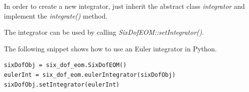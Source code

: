 \documentclass[]{AVSSimReportMemo}
\begin{document}
In order to create a new integrator, just inherit the abstract class \textit{integrator} and implement the \textit{integrate()} method.

The integrator can be used by calling \textit{SixDofEOM::setIntegrator()}.

The following snippet shows how to use an Euler integrator in Python.
\begin{lstlisting}
sixDofObj = six_dof_eom.SixDofEOM()
eulerInt = six_dof_eom.eulerIntegrator(sixDofObj)
sixDofObj.setIntegrator(eulerInt)
\end{lstlisting}
\end{document}
